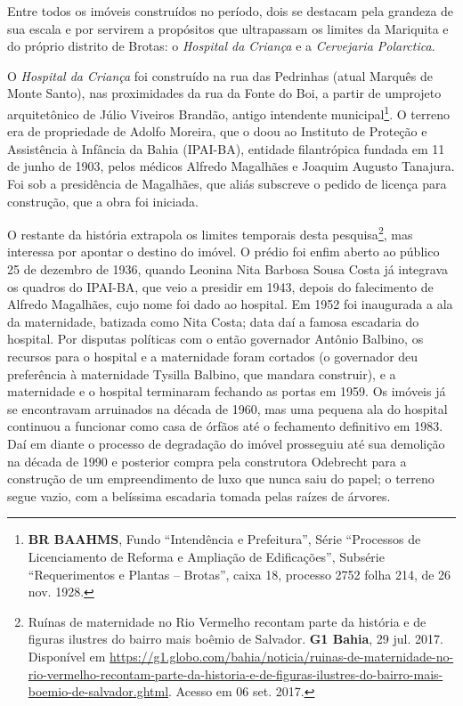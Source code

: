 Entre todos os imóveis construídos no período, dois se destacam pela grandeza de sua escala e por servirem a propósitos que ultrapassam os limites da Mariquita e do próprio distrito de Brotas: o \textit{Hospital da Criança} e a \textit{Cervejaria Polarctica}.

O \textit{Hospital da Criança} foi construído na rua das Pedrinhas (atual Marquês de Monte Santo), nas proximidades da rua da Fonte do Boi, a partir de umprojeto arquitetônico de Júlio Viveiros Brandão, antigo intendente municipal\footnote{\textbf{BR BAAHMS}, Fundo ``Intendência e Prefeitura'', Série ``Processos de Licenciamento de Reforma e Ampliação de Edificações'', Subsérie ``Requerimentos e Plantas -- Brotas'', caixa 18, processo 2752 folha 214, de 26 nov. 1928.}. O terreno era de propriedade de Adolfo Moreira, que o doou ao Instituto de Proteção e Assistência à Infância da Bahia (IPAI-BA), entidade filantrópica fundada em 11 de junho de 1903, pelos médicos Alfredo Magalhães e Joaquim Augusto Tanajura. Foi sob a presidência de Magalhães, que aliás subscreve o pedido de licença para construção, que a obra foi iniciada. 

O restante da história extrapola os limites temporais desta pesquisa\footnote{Ruínas de maternidade no Rio Vermelho recontam parte da história e de figuras ilustres do bairro mais boêmio de Salvador. \textbf{G1 Bahia}, 29 jul. 2017. Disponível em \url{https://g1.globo.com/bahia/noticia/ruinas-de-maternidade-no-rio-vermelho-recontam-parte-da-historia-e-de-figuras-ilustres-do-bairro-mais-boemio-de-salvador.ghtml}. Acesso em 06 set. 2017.}, mas interessa por apontar o destino do imóvel. O prédio foi enfim aberto ao público 25 de dezembro de 1936, quando Leonina Nita Barbosa Sousa Costa já integrava os quadros do IPAI-BA, que veio a presidir em 1943, depois do falecimento de Alfredo Magalhães, cujo nome foi dado ao hospital. Em 1952 foi inaugurada a ala da maternidade, batizada como Nita Costa; data daí a famosa escadaria do hospital. Por disputas políticas com o então governador Antônio Balbino, os recursos para o hospital e a maternidade foram cortados (o governador deu preferência à maternidade Tysilla Balbino, que mandara construir), e a maternidade e o hospital terminaram fechando as portas em 1959. Os imóveis já se encontravam arruinados na década de 1960, mas uma pequena ala do hospital continuou a funcionar como casa de órfãos até o fechamento definitivo em 1983. Daí em diante o processo de degradação do imóvel prosseguiu até sua demolição na década de 1990 e posterior compra pela construtora Odebrecht para a construção de um empreendimento de luxo que nunca saiu do papel; o terreno segue vazio, com a belíssima escadaria tomada pelas raízes de árvores.


